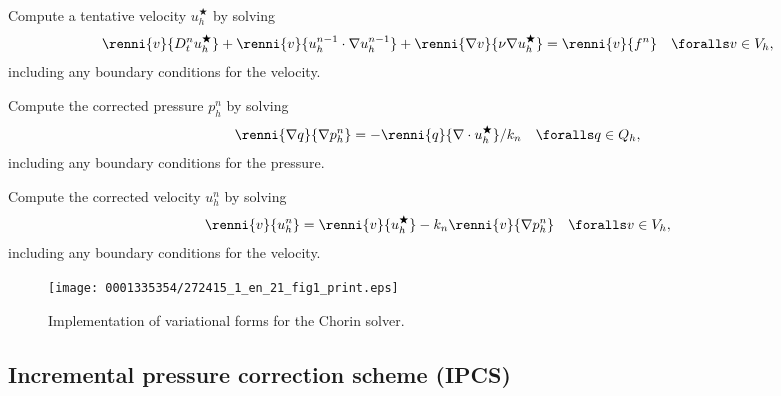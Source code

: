 {
\item
  Compute a tentative velocity $u_h^\bigstar$ by solving
  \begin{equation}\label{eq:chorin,1}
    \renni{v}{D_t^n u_h^\bigstar}
    + \renni{v}{u_h^{n-1} \cdot \nabla u_h^{n-1}}
    + \renni{\nabla v}{\nu \nabla u_h^{\bigstar}}
    = \renni{v}{f^n} \quad \foralls v \in V_h,
  \end{equation}
  including any boundary conditions for the velocity.

\item
  Compute the corrected pressure $p_h^n$ by solving
  \begin{equation}\label{eq:chorin,2}
    \renni{\nabla q}{\nabla p_h^n}
    = -\renni{q}{\nabla \cdot u_h^{\bigstar}} / k_n \quad \foralls q \in Q_h,
  \end{equation}
  including any boundary conditions for the pressure.

\item
  Compute the corrected velocity $u_h^n$ by solving
  \begin{equation}\label{eq:chorin,3}
    \renni{v}{u_h^n} = \renni{v}{u_h^{\bigstar}} - k_n \renni{v}{\nabla p_h^n}
    \quad \foralls v \in V_h,
  \end{equation}
  including any boundary conditions for the velocity.
}

\begin{figure}[!t]
\vspace*{10pt}
\centering
\texttt{[image: 0001335354/272415\_1\_en\_21\_fig1\_print.eps]}
\caption{Implementation of variational forms for the Chorin solver.}
\label{fig:chorin_code}
\end{figure}

\subsection{Incremental pressure correction scheme (IPCS)}
\label{sec:ipcs}


